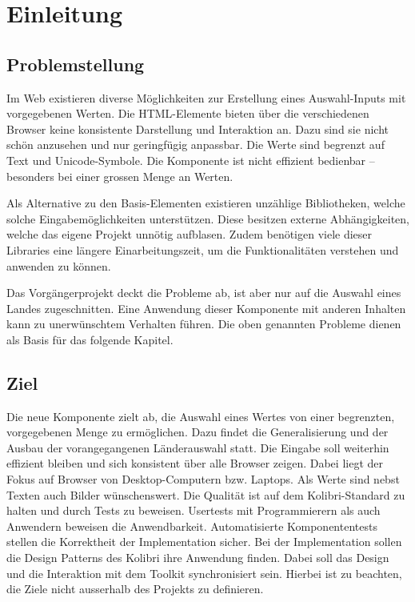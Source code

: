 \chapter{Einleitung}
\label{chap:intro}


\section{Problemstellung}
\label{sec:problem}

Im Web existieren diverse Möglichkeiten zur Erstellung eines Auswahl-Inputs mit vorgegebenen Werten.
Die HTML-Elemente bieten über die verschiedenen Browser keine konsistente Darstellung und Interaktion an.
Dazu sind sie nicht schön anzusehen und nur geringfügig anpassbar. 
Die Werte sind begrenzt auf Text und Unicode-Symbole.
Die Komponente ist nicht effizient bedienbar – besonders bei einer grossen Menge an Werten.

Als Alternative zu den Basis-Elementen existieren unzählige Bibliotheken, welche solche Eingabemöglichkeiten unterstützen.
Diese besitzen externe Abhängigkeiten, welche das eigene Projekt unnötig aufblasen.
Zudem benötigen viele dieser Libraries eine längere Einarbeitungszeit, um die Funktionalitäten verstehen und anwenden zu können.

Das Vorgängerprojekt deckt die Probleme ab, ist aber nur auf die Auswahl eines Landes zugeschnitten.
Eine Anwendung dieser Komponente mit anderen Inhalten kann zu unerwünschtem Verhalten führen.
Die oben genannten Probleme dienen als Basis für das folgende Kapitel.


\section{Ziel}
\label{sec:goal}

Die neue Komponente zielt ab, die Auswahl eines Wertes von einer begrenzten, vorgegebenen Menge zu ermöglichen.
Dazu findet die Generalisierung und der Ausbau der vorangegangenen Länderauswahl statt.
Die Eingabe soll weiterhin effizient bleiben und sich konsistent über alle Browser zeigen.
Dabei liegt der Fokus auf Browser von Desktop-Computern bzw. Laptops.
Als Werte sind nebst Texten auch Bilder wünschenswert.
Die Qualität ist auf dem Kolibri-Standard zu halten und durch Tests zu beweisen.
Usertests mit Programmierern als auch Anwendern beweisen die Anwendbarkeit.
Automatisierte Komponententests stellen die Korrektheit der Implementation sicher.
Bei der Implementation sollen die Design Patterns des Kolibri ihre Anwendung finden.
Dabei soll das Design und die Interaktion mit dem Toolkit synchronisiert sein.
Hierbei ist zu beachten, die Ziele nicht ausserhalb des Projekts zu definieren.


